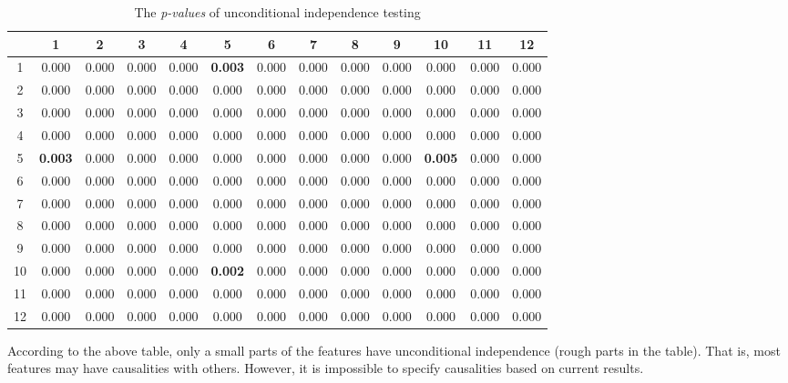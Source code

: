 \documentclass[12pt,a4paper]{article}
\theoremstyle{definition}
\begin{document}
\begin{table}[H]
	\renewcommand\arraystretch{1.35}
	\caption{The \textit{p-values} of unconditional independence testing}
	\label{tab:uncon-in}
	\centering
	
	\begin{tabular}{c|c|c|c|c|c|c|c|c|c|c|c|c}
		\centering
		\diagbox{id}{$p$}{id} & 1 & 2 & 3 & 4 & 5 & 6 & 7 & 8 & 9 & 10 & 11 & 12 \\
		\hline
		1 & 0.000 & 0.000 & 0.000 & 0.000 & \textbf{0.003} & 0.000 & 0.000 & 0.000 & 0.000 & 0.000 & 0.000 & 0.000 \\
		\hline
		2 & 0.000 & 0.000 & 0.000 & 0.000 & 0.000 & 0.000 & 0.000 & 0.000 & 0.000 & 0.000 & 0.000 & 0.000 \\
		\hline
		3 & 0.000 & 0.000 & 0.000 & 0.000 & 0.000 & 0.000 & 0.000 & 0.000 & 0.000 & 0.000 & 0.000 & 0.000 \\
		\hline
		4 & 0.000 & 0.000 & 0.000 & 0.000 & 0.000 & 0.000 & 0.000 & 0.000 & 0.000 & 0.000 & 0.000 & 0.000 \\
		\hline
		5 & \textbf{0.003} & 0.000 & 0.000 & 0.000 & 0.000 & 0.000 & 0.000 & 0.000 & 0.000 & \textbf{0.005} & 0.000 & 0.000 \\
		\hline
		6 & 0.000 & 0.000 & 0.000 & 0.000 & 0.000 & 0.000 & 0.000 & 0.000 & 0.000 & 0.000 & 0.000 & 0.000 \\
		\hline
		7 & 0.000 & 0.000 & 0.000 & 0.000 & 0.000 & 0.000 & 0.000 & 0.000 & 0.000 & 0.000 & 0.000 & 0.000 \\
		\hline
		8 & 0.000 & 0.000 & 0.000 & 0.000 & 0.000 & 0.000 & 0.000 & 0.000 & 0.000 & 0.000 & 0.000 & 0.000 \\
		\hline
		9 & 0.000 & 0.000 & 0.000 & 0.000 & 0.000 & 0.000 & 0.000 & 0.000 & 0.000 & 0.000 & 0.000 & 0.000 \\
		\hline
		10 & 0.000 & 0.000 & 0.000 & 0.000 & \textbf{0.002} & 0.000 & 0.000 & 0.000 & 0.000 & 0.000 & 0.000 & 0.000 \\
		\hline
		11 & 0.000 & 0.000 & 0.000 & 0.000 & 0.000 & 0.000 & 0.000 & 0.000 & 0.000 & 0.000 & 0.000 & 0.000 \\
		\hline
		12 & 0.000 & 0.000 & 0.000 & 0.000 & 0.000 & 0.000 & 0.000 & 0.000 & 0.000 & 0.000 & 0.000 & 0.000 \\
	\end{tabular}
\end{table}

According to the above table, only a small parts of the features have unconditional independence (rough parts in the table). That is, most features may have causalities with others. However, it is impossible to specify causalities based on current results.
\end{document}
